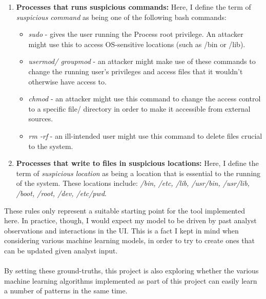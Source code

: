 \begin{enumerate}
		\item \textbf{Processes that runs suspicious commands: }Here, I define the term of \textit{suspicious command} as being one of the following bash commands:
		\begin{itemize}
			\item \textit{sudo} - gives the user running the Process root privilege. An attacker might use this to access OS-sensitive locations (such as /bin or /lib). 
			\item \textit{usermod/ groupmod} - an attacker might make use of these commands to change the running user's privileges and access files that it wouldn't otherwise have access to.
			\item \textit{chmod} - an attacker might use this command to change the access control to a specific file/ directory in order to make it accessible from external sources.
			\item \textit{rm -rf} - an ill-intended user might use this command to delete files crucial to the system. 
		\end{itemize}
	
		\item \textbf{Processes that write to files in suspicious locations: }Here, I define the term of \textit{suspicious location} as being a location that is essential to the running of the system. These locations include:  \textit{/bin, /etc, /lib, /usr/bin, /usr/lib, /boot, /root, /dev, /etc/pwd}.
	\end{enumerate}
	These rules only represent a suitable starting point for the tool implemented here. In practice, though, I would expect my model to be driven by past analyst observations and interactions in the UI. This is a fact I kept in mind when considering various machine learning models, in order to try to create ones that can be updated given analyst input.
	\\ \\
	By setting these ground-truths, this project is also exploring whether the various machine learning algorithms implemented as part of this project can easily learn a number of patterns in the same time.
